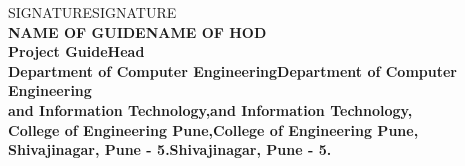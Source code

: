\begin{center}		%

SIGNATURESIGNATURE\\
\normalsize{\bf{NAME OF GUIDENAME OF HOD\\
Project GuideHead}\\
Department of Computer EngineeringDepartment of Computer Engineering\\
and Information Technology,and Information Technology,\\
College of Engineering Pune,College of Engineering Pune,\\
Shivajinagar, Pune - 5.Shivajinagar, Pune - 5.}
\end{center}

